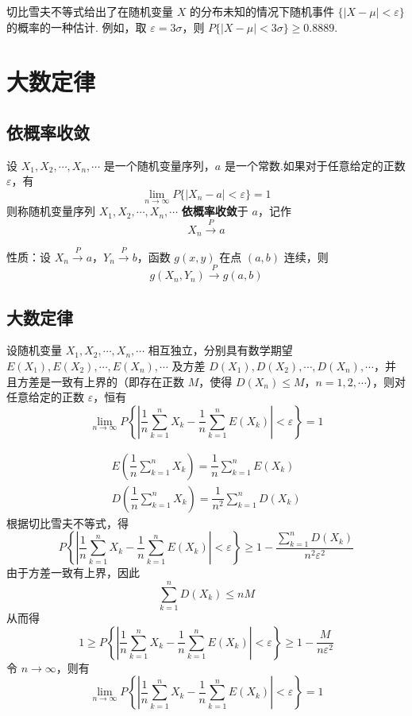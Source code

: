切比雪夫不等式给出了在随机变量 $X$ 的分布未知的情况下随机事件 $\{ |X-\mu| < \varepsilon \}$ 的概率的一种估计. 例如，取 $\varepsilon = 3\sigma$，则 $P\{ |X-\mu| < 3\sigma \} \geqslant 0.8889$.

\section{大数定律}

\subsection{依概率收敛}

\begin{definition}
    设 $X_1, X_2, \cdots, X_n, \cdots$ 是一个随机变量序列，$a$ 是一个常数.如果对于任意给定的正数 $\varepsilon$，有
    $$
    \lim_{n \to \infty} P \{ |X_n-a| < \varepsilon \} = 1
    $$
    则称随机变量序列 $X_1, X_2, \cdots, X_n, \cdots$ \textbf{依概率收敛}于 $a$，记作
    $$
    X_n \overset{P}{\longrightarrow} a
    $$
\end{definition}

性质：设 $X_n \overset{P}{\longrightarrow} a$，$Y_n \overset{P}{\longrightarrow} b$，函数 $g(x,y)$ 在点 $(a,b)$ 连续，则
$$
g(X_n, Y_n) \overset{P}{\longrightarrow} g(a,b)
$$

\subsection{大数定律}

\begin{theorem}[（切比雪夫定理）]
    设随机变量 $X_1, X_2, \cdots, X_n, \cdots$ 相互独立，分别具有数学期望 $E(X_1), E(X_2), \cdots, E(X_n), \cdots$ 及方差 $D(X_1), D(X_2), \cdots, D(X_n), \cdots$，并且方差是一致有上界的（即存在正数 $M$，使得 $D(X_n) \leqslant M$，$n=1,2,\cdots$），则对任意给定的正数 $\varepsilon$，恒有
    $$
    \lim_{n \to \infty} P \left\{ \left| \dfrac{1}{n} \sum_{k=1}^n X_k - \dfrac{1}{n} \sum_{k=1}^n E(X_k) \right| < \varepsilon \right\} = 1
    $$
\end{theorem}

\begin{myproof}
    $$
    \begin{gathered}
        E(\dfrac{1}{n} \sum_{k=1}^n X_k) = \dfrac{1}{n} \sum_{k=1}^n E(X_k) \\
        D(\dfrac{1}{n} \sum_{k=1}^n X_k) = \dfrac{1}{n^2} \sum_{k=1}^n D(X_k)
    \end{gathered}
    $$
    根据切比雪夫不等式，得
    $$
    P \left\{ \left| \dfrac{1}{n} \sum_{k=1}^n X_k - \dfrac{1}{n} \sum_{k=1}^n E(X_k) \right| < \varepsilon \right\} \geqslant 1 - \dfrac{\displaystyle\sum_{k=1}^n D(X_k)}{n^2 \varepsilon^2}
    $$
    由于方差一致有上界，因此
    $$
    \sum_{k=1}^n D(X_k) \leqslant nM
    $$
    从而得
    $$
    1 \geqslant P \left\{ \left| \dfrac{1}{n} \sum_{k=1}^n X_k - \dfrac{1}{n} \sum_{k=1}^n E(X_k) \right| < \varepsilon \right\} \geqslant 1 - \dfrac{M}{n \varepsilon^2}
    $$
    令 $n \to \infty$，则有
    $$
    \lim_{n \to \infty} P \left\{ \left| \dfrac{1}{n} \sum_{k=1}^n X_k - \dfrac{1}{n} \sum_{k=1}^n E(X_k) \right| < \varepsilon \right\} = 1
    $$
\end{myproof}

